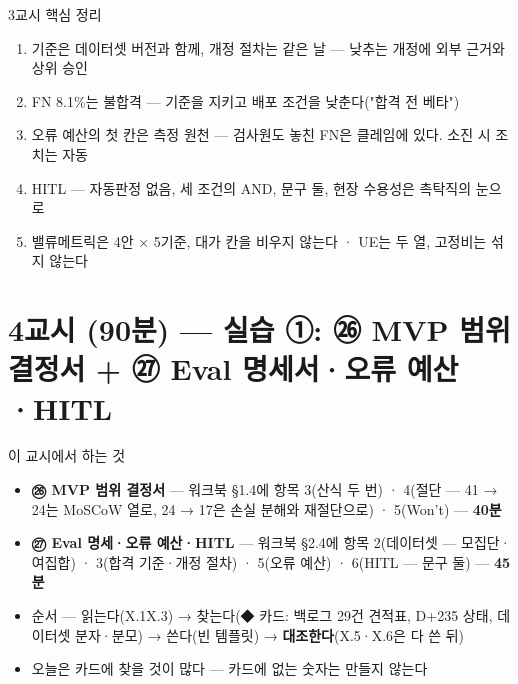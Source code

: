 \begin{frame}{3교시 핵심 정리}
\begin{enumerate}
\item 기준은 데이터셋 버전과 함께, 개정 절차는 같은 날 — 낮추는 개정에 외부 근거와 상위 승인
\item FN 8.1\%는 불합격 — 기준을 지키고 배포 조건을 낮춘다("합격 전 베타")
\item 오류 예산의 첫 칸은 측정 원천 — 검사원도 놓친 FN은 클레임에 있다. 소진 시 조치는 자동
\item HITL — 자동판정 없음, 세 조건의 AND, 문구 둘, 현장 수용성은 촉탁직의 눈으로
\item 밸류메트릭은 4안 × 5기준, 대가 칸을 비우지 않는다 · UE는 두 열, 고정비는 섞지 않는다
\end{enumerate}
\end{frame}

\section{4교시 (90분) — 실습 ①: ㉖ MVP 범위 결정서 + ㉗ Eval 명세서·오류 예산·HITL}
\begin{frame}{이 교시에서 하는 것}
\begin{itemize}
\item \textbf{㉖ MVP 범위 결정서} — 워크북 §1.4에 항목 3(산식 두 번) · 4(절단 — 41 → 24는 MoSCoW 열로, 24 → 17은 손실 분해와 재절단으로) · 5(Won't) — \textbf{40분}
\item \textbf{㉗ Eval 명세·오류 예산·HITL} — 워크북 §2.4에 항목 2(데이터셋 — 모집단·여집합) · 3(합격 기준·개정 절차) · 5(오류 예산) · 6(HITL — 문구 둘) — \textbf{45분}
\item 순서 — 읽는다(X.1\til{}X.3) → 찾는다(◆ 카드: 백로그 29건 견적표, D+235 상태, 데이터셋 분자·분모) → 쓴다(빈 템플릿) → \textbf{대조한다}(X.5·X.6은 다 쓴 뒤)
\item 오늘은 카드에 찾을 것이 많다 — 카드에 없는 숫자는 만들지 않는다
\end{itemize}
\end{frame}

